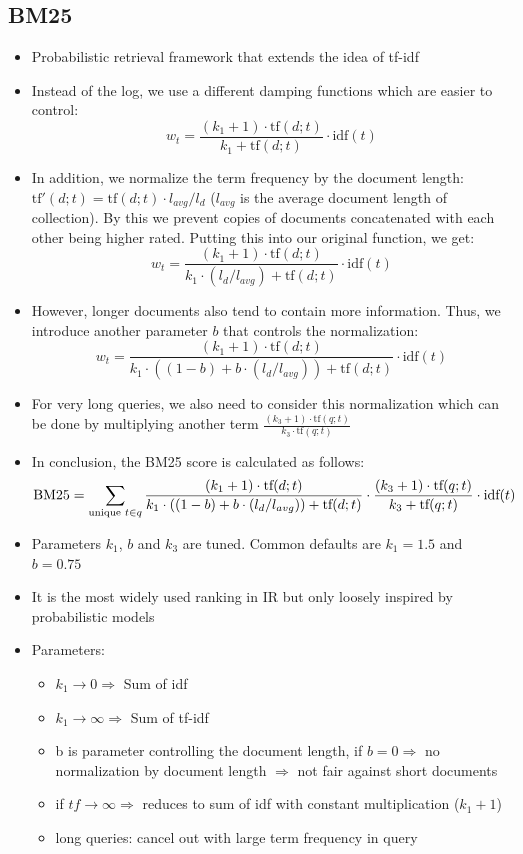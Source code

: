 \subsection{BM25}
\begin{itemize}
	\item Probabilistic retrieval framework that extends the idea of tf-idf
	\item Instead of the log, we use a different damping functions which are easier to control:
	$$w_t = \frac{(k_1 + 1)\cdot \text{tf}(d;t)}{k_1 + \text{tf}(d;t)}\cdot \text{idf}(t)$$
	\item In addition, we normalize the term frequency by the document length: $\text{tf}'(d;t) = \text{tf}(d;t) \cdot l_{avg}/l_{d}$ ($l_{avg}$ is the average document length of collection). By this we prevent copies of documents concatenated with each other being higher rated. Putting this into our original function, we get:
	$$w_t = \frac{(k_1 + 1) \cdot \text{tf}(d;t)}{k_1 \cdot (l_d / l_{avg})+ \text{tf}(d;t)}\cdot \text{idf}(t)$$
	\item However, longer documents also tend to contain more information. Thus, we introduce another parameter $b$ that controls the normalization:
	$$w_t = \frac{(k_1 + 1) \cdot \text{tf}(d;t)}{k_1 \cdot ((1-b) + b\cdot (l_d / l_{avg}))+ \text{tf}(d;t)}\cdot \text{idf}(t)$$
	\item For very long queries, we also need to consider this normalization which can be done by multiplying another term $\frac{(k_3 + 1)\cdot \text{tf}(q;t)}{k_3 \cdot \text{tf}(q;t)}$
	\item In conclusion, the BM25 score is calculated as follows:
	$$\text{BM25} = \sum\limits_{\text{unique\hspace{1mm}} t\in q} \frac{(k_1 + 1) \cdot \text{tf}(d;t)}{k_1 \cdot ((1-b) + b\cdot (l_d / l_{avg}))+ \text{tf}(d;t)} \cdot \frac{(k_3 + 1)\cdot \text{tf}(q;t)}{k_3 + \text{tf}(q;t)} \cdot \text{idf}(t)$$
	\item Parameters $k_1$, $b$ and $k_3$ are tuned. Common defaults are $k_1 = 1.5$ and $b=0.75$
	\item It is the most widely used ranking in IR but only loosely inspired by probabilistic models
	\item Parameters:
	\begin{itemize}
		\item $k_1 \rightarrow 0 \Rightarrow$ Sum of idf
		\item $k_1 \rightarrow \infty \Rightarrow$ Sum of tf-idf
		\item b is parameter controlling the document length, if $b=0 \Rightarrow$ no normalization by document length $\Rightarrow$ not fair against short documents
		\item if $tf \rightarrow \infty \Rightarrow$ reduces to sum of idf with constant multiplication ($k_1 + 1$)
		\item long queries: cancel out with large term frequency in query
	\end{itemize}
\end{itemize}
